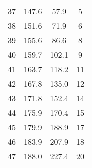 \documentclass[10pt, a4paper]{article}
\begin{document}
\begin{center}
\begin{tabular}{c|c|c|c}
		37 & 147.6 & 57.9 & 5 \\
		38 & 151.6 & 71.9 & 6 \\
		39 & 155.6 & 86.6 & 8 \\
		40 & 159.7 & 102.1 & 9 \\
		41 & 163.7 & 118.2 & 11 \\
		42 & 167.8 & 135.0 & 12 \\
		43 & 171.8 & 152.4 & 14 \\
		44 & 175.9 & 170.4 & 15 \\
		45 & 179.9 & 188.9 & 17 \\
		46 & 183.9 & 207.9 & 18 \\
		47 & 188.0 & 227.4 & 20 \\
	\end{tabular}
\end{center}
\newpage
\end{document}
